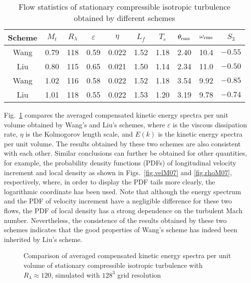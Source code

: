 \documentclass[review]{elsarticle}
\begin{document}
\begin{table}
  \centering
  \caption{Flow statistics of stationary compressible isotropic turbulence obtained by different schemes}
  \begin{tabular}{|cccccccccc|}  \hline
  Scheme & $M_t$ & $R_\lambda$& $\varepsilon$ & $\eta$ & $L_f$ & $T_e$ & $\theta_{\rm rms}$ & $\omega_{\rm rms}$ & $S_3$ \\ \hline
  Wang & 0.79 & 118 & 0.59 & 0.022 & 1.52 & 1.18 & 2.40 & 10.4 & $-0.55$ \\
  Liu  & 0.80 & 115 & 0.65 & 0.021 & 1.50 & 1.14 & 2.34 & 11.0 & $-0.50$ \\  \hline
  Wang & 1.02 & 116 & 0.58 & 0.022 & 1.52 & 1.18 & 3.54 & 9.92 & $-0.85$ \\
  Liu  & 1.01 & 118 & 0.55 & 0.022 & 1.53 & 1.20 & 3.19 & 9.78 & $-0.74$ \\  \hline
  \end{tabular}
  \label{tab1}
\end{table}

Fig.~\ref{fig.EM07} compares the averaged compensated kinetic energy spectra per unit volume obtained by Wang's and Liu's schemes, where $\varepsilon$ is the viscous dissipation rate, $\eta$ is the Kolmogorov length scale, and $E(k)$ is the kinetic energy spectra per unit volume. The results obtained by these two schemes are also consistent with each other. Similar conclusions can further be obtained for other quantities, for example, the probability density functions (PDFs) of longitudinal velocity increment and local density as shown in Figs.~\ref{fig.velM07} and \ref{fig.rhoM07}, respectively, where, in order to display the PDF tails more clearly, the logarithmic coordinate has been used. Note that although the energy spectrum and the PDF of velocity increment have a negligible difference for these two flows, the PDF of local density has a strong dependence on the turbulent Mach number. Nevertheless, the consistence of the results obtained by these two schemes indicates that the good properties of Wang's scheme has indeed been inherited by Liu's scheme.

\begin{figure}
  \centering
  \subfigure[$M_t \approx 0.8$]{\texttt{[image: E\_M\_08]}}
  \subfigure[$M_t \approx 1.0$]{\texttt{[image: E\_M\_10]}}
  \caption{Comparison of averaged compensated kinetic energy spectra per unit volume of stationary compressible isotropic turbulence with $R_\lambda \approx 120$, simulated with $128^3$ grid resolution}
  \label{fig.EM07}
\end{figure}
\end{document}
